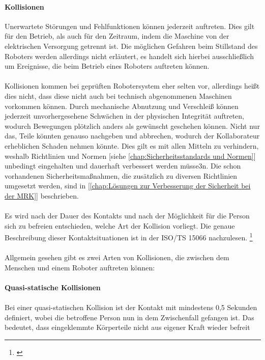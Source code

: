 \documentclass[titlepage,12pt,twoside]{article}
\begin{document}
\paragraph{Kollisionen}
\hfill \break
\hfill \break
Unerwartete Störungen und Fehlfunktionen können jederzeit auftreten. Dies gilt für 
den Betrieb, als auch für den Zeitraum, indem die Maschine von der elektrischen 
Versorgung getrennt ist. Die möglichen Gefahren beim Stillstand des Roboters 
werden allerdings nicht erläutert, es handelt sich hierbei ausschließlich um 
Ereignisse, die beim Betrieb eines Roboters auftreten können. \\
\\
Kollisionen kommen bei geprüften Robotersystem eher selten vor, allerdings heißt 
dies nicht, dass diese nicht auch bei technisch abgenommenen Maschinen vorkommen 
können. Durch mechanische Abnutzung und Verschleiß können jederzeit 
unvorhergesehene Schwächen in der physischen Integrität auftreten, wodurch 
Bewegungen plötzlich anders als gewünscht geschehen können. Nicht nur das, Teile 
könnten genauso nachgeben und abbrechen, wodurch der Kollaborateur erheblichen 
Schaden nehmen könnte. Dies gilt es mit allen Mitteln zu verhindern, weshalb 
Richtlinien und Normen [siehe \textcolor{blue}{\autoref{chap:Sicherheitsstandards und Normen}}]
unbedingt eingehalten und dauerhaft verbessert werden müsse3n. Die schon vorhandenen 
Sicherheitsmaßnahmen, die zusätzlich zu diversen Richtlinien umgesetzt werden, 
sind in [\textcolor{blue}{\autoref{chap:Lösungen zur Verbesserung der Sicherheit bei der MRK}}] beschrieben. \\
\\
Es wird nach der Dauer des Kontakts und nach der Möglichkeit für die Person sich 
zu befreien entschieden, welche Art der Kollision vorliegt. Die genaue 
Beschreibung dieser Kontaktsituationen ist in der ISO/TS 15066 nachzulesen. \footnote{\cite{Frauenhofer17}} \\
\\
Allgemein gesehen gibt es zwei Arten von Kollisionen, die zwischen dem Menschen 
und einem Roboter auftreten können: \\
\\
\textbf{Quasi-statische Kollisionen} \\
\\
Bei einer quasi-statischen Kollision ist der Kontakt mit mindestens 0,5 Sekunden 
definiert, wobei die betroffene Person nun in dem Zwischenfall gefangen ist. Das 
bedeutet, dass eingeklemmte Körperteile nicht aus eigener Kraft wieder befreit 
\end{document}
